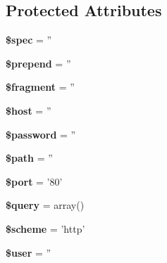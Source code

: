 \subsection*{Protected Attributes}
\begin{DoxyCompactItemize}
\item 
\hypertarget{classTk_1_1Url_a4adf3cc537167186e0d4b9d5990d2560}{{\bfseries \$spec} = ''}\label{classTk_1_1Url_a4adf3cc537167186e0d4b9d5990d2560}

\item 
\hypertarget{classTk_1_1Url_acefef4b82bcdccd0236cc1014cfd275d}{{\bfseries \$prepend} = ''}\label{classTk_1_1Url_acefef4b82bcdccd0236cc1014cfd275d}

\item 
\hypertarget{classTk_1_1Url_a2ea6131596502fe874d768c5c2c390d5}{{\bfseries \$fragment} = ''}\label{classTk_1_1Url_a2ea6131596502fe874d768c5c2c390d5}

\item 
\hypertarget{classTk_1_1Url_a750351141ab99894d7734b61c7aed7cb}{{\bfseries \$host} = ''}\label{classTk_1_1Url_a750351141ab99894d7734b61c7aed7cb}

\item 
\hypertarget{classTk_1_1Url_a3524c69505ec46716b0c8b3a1e3a6949}{{\bfseries \$password} = ''}\label{classTk_1_1Url_a3524c69505ec46716b0c8b3a1e3a6949}

\item 
\hypertarget{classTk_1_1Url_a1d927bf8891c8ff83f5e58155d0025ae}{{\bfseries \$path} = ''}\label{classTk_1_1Url_a1d927bf8891c8ff83f5e58155d0025ae}

\item 
\hypertarget{classTk_1_1Url_ab70b302bbb0a0924b027be0722e12843}{{\bfseries \$port} = '80'}\label{classTk_1_1Url_ab70b302bbb0a0924b027be0722e12843}

\item 
\hypertarget{classTk_1_1Url_aeeb3732d4f7ef42d1de24688c660dac2}{{\bfseries \$query} = array()}\label{classTk_1_1Url_aeeb3732d4f7ef42d1de24688c660dac2}

\item 
\hypertarget{classTk_1_1Url_a3ffe84cafb832d0f5c2a08a68e07808b}{{\bfseries \$scheme} = 'http'}\label{classTk_1_1Url_a3ffe84cafb832d0f5c2a08a68e07808b}

\item 
\hypertarget{classTk_1_1Url_a478003c5b43a4ab087c7ae8f7c0188dd}{{\bfseries \$user} = ''}\label{classTk_1_1Url_a478003c5b43a4ab087c7ae8f7c0188dd}

\end{DoxyCompactItemize}


